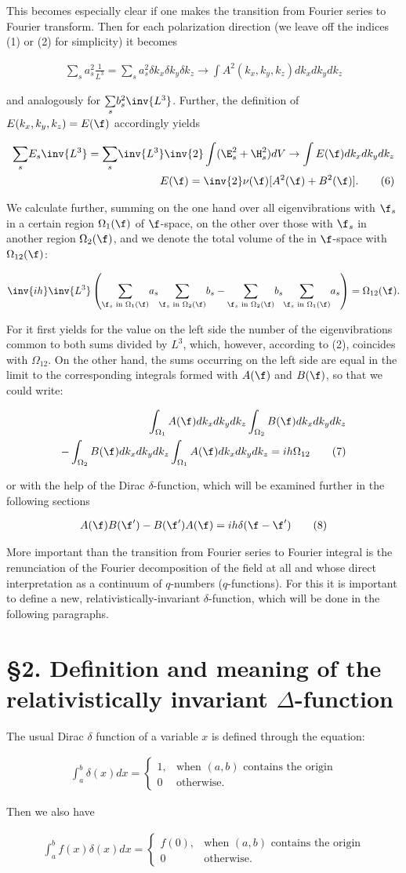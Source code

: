 \documentclass{article}
\newcommand{\nequ}[2]{
\begin{align*}
#1
\tag{#2}
\end{align*}
}
\newcommand{\uequ}[1]{
\begin{align*}
#1
\end{align*}
}
\newcommand{\sumX}[1]{\underset{#1}{\sum}}
\begin{document}
This becomes especially clear if one makes the transition from Fourier series to Fourier transform. Then for each polarization direction (we leave off the indices (1) or (2) for simplicity) it becomes
\uequ{
\sumX{s}a_s^2 \frac{1}{L^3} = \sumX{s}a_s^2 \delta k_x \delta k_y \delta k_z \to
\int A^2(k_x,k_y,k_z)dk_x dk_y dk_z
}
and analogously for $\sumX{s}b_s^2\inv{L^3}$. Further, the definition of $E(k_x,k_y,k_z)=E(\f)$ accordingly yields
\nequ{
\sumX{s}E_s \inv{L^3} = \sumX{s}\inv{L^3}\inv{2}\int(\E_s^2 + \H_s^2)dV \to
\int E(\f)dk_x dk_y dk_z\\
E(\f) = \inv{2}\nu(\f)[A^2(\f) + B^2(\f)].
}{6}
We calculate further, summing on the one hand over all eigenvibrations with $\f_s$ in a certain region $\Omega_1(\f)$ of $\f$-space, on the other over those with $\f_s$ in another region $\Omega_2(\f)$, and  we denote the total volume of the  in $\f$-space with $\Omega_{12}(\f)$:
\uequ{
\inv{ih}\inv{L^3}\left(
\sumX{\f_s\text{ in }\Omega_1(\f)} a_s \sumX{\f_s\text{ in }\Omega_2(\f)} b_s - 
\sumX{\f_s\text{ in }\Omega_2(\f)} b_s \sumX{\f_s\text{ in }\Omega_1(\f)} a_s
\right) = \Omega_{12}(\f).
}
For it first yields for the value on the left side the number of the eigenvibrations common to both sums divided by $L^3$, which, however, according to (2), coincides with $\Omega_{12}$. On the other hand, the sums occurring on the left side are equal in the limit to the corresponding integrals formed with $A(\f)$ and $B(\f)$, so that we could write:
\nequ{
\int_{\Omega_1}A(\f)dk_x dk_y dk_z \int_{\Omega_2} B(\f) dk_x dk_y dk_z \\
- \int_{\Omega_2}B(\f) dk_x dk_y dk_z \int_{\Omega_1} A(\f)dk_x dk_y dk_z = ih\Omega_{12}
}{7}
or with the help of the Dirac $\delta$-function, which will be examined further in the following sections
\nequ{
A(\f)B(\f') - B(\f')A(\f) = ih\delta(\f - \f')
}{8}

More important than the transition from Fourier series to Fourier integral is the renunciation of the Fourier decomposition of the field at all and whose direct interpretation as a continuum of $q$-numbers ($q$-functions). For this it is important to define a new, relativistically-invariant $\delta$-function, which will be done in the following paragraphs.

\section*{§2. Definition and meaning of the relativistically invariant $\Delta$-function}
The usual Dirac $\delta$ function of a variable $x$ is defined through the equation:
\nequ{
\int_a^b \delta(x)dx = \left\{
     \begin{array}{lr}
       1, & \text{when $(a,b)$ contains the origin}\\
       0  & \text{otherwise.}
     \end{array}
   \right.
}{9}
Then we also have
\nequ{
\int_a^b f(x)\delta(x)dx = \left\{
     \begin{array}{lr}
       f(0), & \text{when $(a,b)$ contains the origin}\\
       0  & \text{otherwise.}
     \end{array}
   \right.
}{10}
\end{document}
